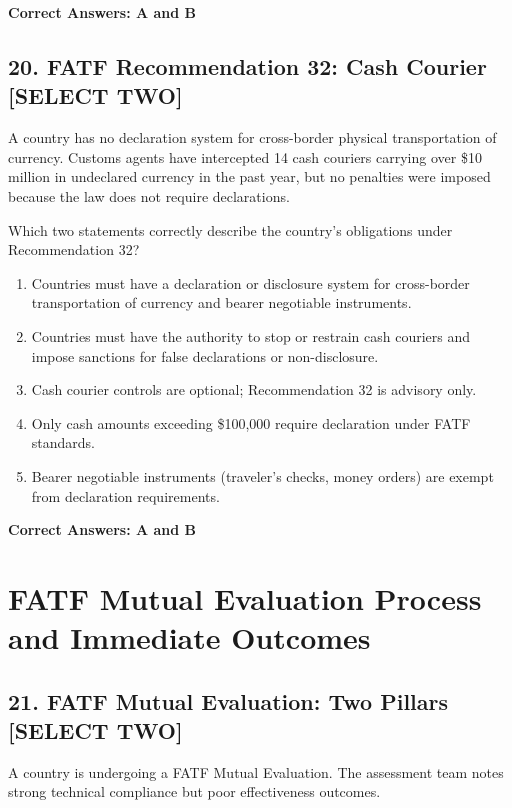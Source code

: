 \documentclass[11pt,a4paper]{article}
\begin{document}
	\textbf{Correct Answers: A and B}
	
	\subsection{20. FATF Recommendation 32: Cash Courier \textnormal{[SELECT TWO]}}
	
	A country has no declaration system for cross-border physical transportation of currency. Customs agents have intercepted 14 cash couriers carrying over \$10 million in undeclared currency in the past year, but no penalties were imposed because the law does not require declarations.
	
	Which two statements correctly describe the country's obligations under Recommendation 32?
	
	\begin{enumerate}[label=\Alph*.]
		\item Countries must have a declaration or disclosure system for cross-border transportation of currency and bearer negotiable instruments.
		\item Countries must have the authority to stop or restrain cash couriers and impose sanctions for false declarations or non-disclosure.
		\item Cash courier controls are optional; Recommendation 32 is advisory only.
		\item Only cash amounts exceeding \$100,000 require declaration under FATF standards.
		\item Bearer negotiable instruments (traveler's checks, money orders) are exempt from declaration requirements.
	\end{enumerate}
	
	\textbf{Correct Answers: A and B}
	
	\section{FATF Mutual Evaluation Process and Immediate Outcomes}
	
	\subsection{21. FATF Mutual Evaluation: Two Pillars \textnormal{[SELECT TWO]}}
	
	A country is undergoing a FATF Mutual Evaluation. The assessment team notes strong technical compliance but poor effectiveness outcomes.
	
\end{document}
